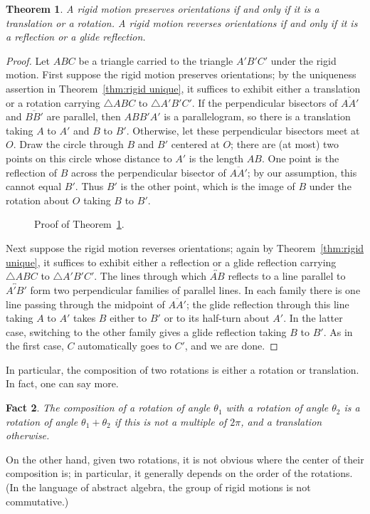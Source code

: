 \documentclass[12pt]{book}
\numberwithin{exc}{section}
\numberwithin{figure}{section}
\newtheorem{theorem}{Theorem}[section]
\newtheorem{fact}[theorem]{Fact}
\numberwithin{equation}{theorem}
\def\line#1{\overleftrightarrow{#1}}
\def\seg#1{\overline{#1}}
\begin{document}
 
\begin{theorem} \label{thm:classify rigid}
A rigid motion preserves orientations if and only if it is a translation or
a rotation. A rigid motion reverses orientations if and only if it is a reflection or a glide reflection.
\end{theorem}
\begin{proof}
Let $ABC$ be a triangle carried to the triangle $A'B'C'$ under the rigid
motion. First suppose the rigid motion preserves orientations; by the
uniqueness assertion in Theorem~\ref{thm:rigid unique}, it suffices to exhibit
either a translation or a rotation carrying $\triangle ABC$ to $\triangle A'B'C'$.
If the perpendicular bisectors of $\seg{AA'}$ and $\seg{BB'}$ are parallel,
then $ABB'A'$ is a parallelogram, so there is a translation taking $A$ to
$A'$ and $B$ to $B'$. Otherwise, let these perpendicular bisectors meet
at $O$. Draw the circle through $B$ and $B'$ centered at $O$; there
are (at most) two points on this circle whose distance to $A'$ is
the length $AB$. One point is the reflection of $B$ across the perpendicular
bisector of $\seg{AA'}$; by our assumption, this cannot equal $B'$. Thus $B'$
is the other point, which is the image of $B$ under the rotation about $O$
taking $B$ to $B'$.
\begin{figure}[ht]
\caption{Proof of Theorem~\ref{thm:classify rigid}.}
\end{figure}

Next suppose the rigid motion reverses orientations; again by
Theorem~\ref{thm:rigid unique}, it suffices to exhibit either a reflection or a glide reflection carrying $\triangle ABC$ to $\triangle A'B'C'$.
The lines through which $\line{AB}$ reflects to a line parallel to $\line{A'B'}$
form two perpendicular families of parallel lines. In each family there is
one line passing through the midpoint of $\seg{AA'}$; the glide reflection through 
this line taking $A$ to $A'$ takes $B$ either to $B'$ or to its half-turn
about $A'$. In the latter case, switching to the other family gives a
glide reflection taking $B$ to $B'$. As in the first case,
$C$ automatically goes to $C'$, and we are done.
\end{proof}

In particular, the composition of two rotations is either a rotation 
or translation. In fact, one can say more.
\begin{fact}
The composition of a rotation of angle $\theta_{1}$ with a rotation of 
angle $\theta_{2}$ is a rotation of angle $\theta_{1} + \theta_{2}$ if 
this is not a multiple of $2\pi$, and a translation otherwise.
\end{fact}
On the other hand, given two rotations, it is not 
obvious where the center of their composition is; in particular, it
generally depends on the order of the rotations. (In the language of abstract algebra, 
the group of rigid motions  is not commutative.)
\end{document}
